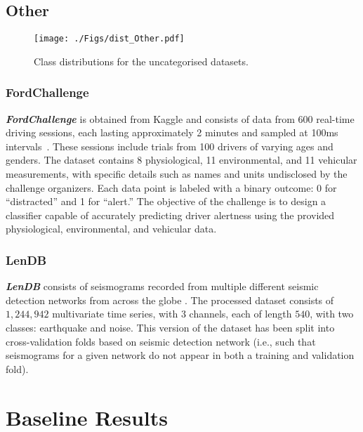 \documentclass[twoside,11pt,preprint]{article}
\begin{document}
\subsection{Other}

\begin{figure}[h]%
    \centering%
    \texttt{[image: ./Figs/dist\_Other.pdf]}%
    \caption{Class distributions for the uncategorised datasets.}%
    \label{fig-class-dist-other}
\end{figure}%

\subsubsection{FordChallenge}

\textbf{\textit{FordChallenge}} is obtained from Kaggle and consists of data from 600 real-time driving sessions, each lasting approximately 2 minutes and sampled at 100ms intervals~\citep{stayalert}. These sessions include trials from 100 drivers of varying ages and genders. The dataset contains 8 physiological, 11 environmental, and 11 vehicular measurements, with specific details such as names and units undisclosed by the challenge organizers. Each data point is labeled with a binary outcome: 0 for ``distracted'' and 1 for ``alert.'' The objective of the challenge is to design a classifier capable of accurately predicting driver alertness using the provided physiological, environmental, and vehicular data.

\subsubsection{LenDB}

\textbf{\textit{LenDB}} consists of seismograms recorded from multiple different seismic detection networks from across the globe \citep{data_lendb_2020,magrini_etal_2020}. The processed dataset consists of $1{,}244{,}942$ multivariate time series, with $3$ channels, each of length $540$, with two classes: earthquake and noise. This version of the dataset has been split into cross-validation folds based on seismic detection network (i.e., such that seismograms for a given network do not appear in both a training and validation fold).


\section{Baseline Results} \label{sec-results}
\end{document}
